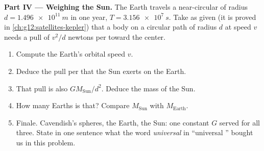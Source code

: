\begin{problem}
\medskip
\noindent\textbf{Part IV --- Weighing the Sun.}
The Earth travels a near-circular  of radius
$d = \qty{1.496e11}{m}$ in one year, $T = \qty{3.156e7}{s}$. Take as
given (it is proved in \cref{ch:g12:satellites-kepler}) that a body on
a circular path of radius $d$ at speed $v$ needs a pull of $v^2/d$
newtons per  toward the center.
\begin{enumerate}[resume]
  \item Compute the Earth's orbital speed $v$.
  \item Deduce the pull per  that the Sun exerts on the Earth.
  \item That pull is also $G M_{\text{Sun}} / d^2$. Deduce the mass of
        the Sun.
  \item How many Earths is that? Compare $M_{\text{Sun}}$ with
        $M_{\text{Earth}}$.
  \item Finale. Cavendish's spheres, the Earth, the Sun: one constant
        $G$ served for all three. State in one sentence what the word
        \emph{universal} in ``universal '' bought us in
        this problem.
\end{enumerate}
\end{problem}
